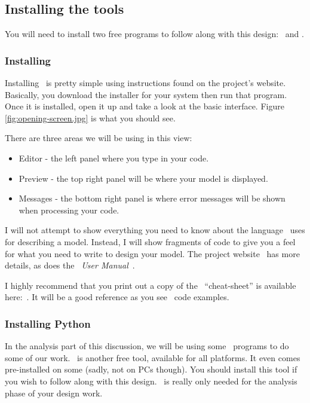 \subsection{Installing the tools}

You will need to install two free programs to follow along with this design: \osc\ and \PY.

\subsubsection{Installing \osc}

Installing \osc\ is pretty simple using instructions found on the project's
website. Basically, you download the installer for your system then run that program. Once it is installed, open it up and take a look at the basic
interface.  Figure \ref{fig:opening-screen.jpg} is what you should see.


There are three areas we will be using in this view:

\begin{itemize}
\item{Editor - the left panel where you type in your code.}
\item{Preview - the top right panel will be where your model is displayed.}
\item{Messages - the bottom right panel is where error messages will be shown
when processing your code.}
\end{itemize}

I will not attempt to show everything you need to know about the language \osc\
uses for describing a model. Instead, I will show fragments of code to give you
a feel for what you need to write to design your model. The project
website~\cite{blackr} has more details, as does the \osc\ {\it User
Manual}~\cite{userman}.

I highly recommend that you  print out a copy of the \osc\
``cheat-sheet'' is available here:~\cite{osccheat}. It will be a good reference
as you see \osc\ code examples.

\subsubsection{Installing Python}

In the analysis part of this discussion, we will be using some \PY\ programs to
do some of our work. \PY\ is another free tool, available for all platforms. It
even comes pre-installed on some (sadly, not on PCs though). You should install
this tool if you wish to follow along with this design. \PY\ is really only
needed for the analysis phase of your design work.

